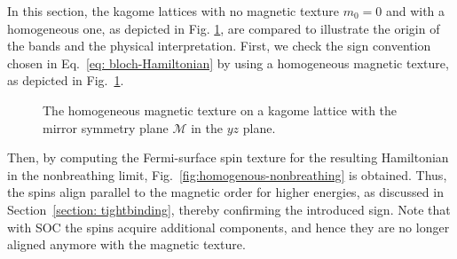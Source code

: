 
In this section, the kagome lattices with no magnetic texture $m_0=0$ and with a homogeneous one, as depicted in Fig. \ref{fig: magnetic texture homogenous}, are compared to illustrate the origin of the bands and the physical interpretation. 
First, we check the sign convention chosen in Eq.~\eqref{eq: bloch-Hamiltonian} by using a homogeneous magnetic texture, as depicted in Fig.~\ref{fig: magnetic texture homogenous}. 

\begin{figure}[tbhp]
    \centering
    \caption{The homogeneous magnetic texture on a kagome lattice with the mirror symmetry plane $\mathcal{M}$ in the $yz$ plane.}
    \label{fig: magnetic texture homogenous}
\end{figure}
Then, by computing the Fermi-surface spin texture for the resulting Hamiltonian in the nonbreathing limit, Fig.~\ref{fig:homogenous-nonbreathing} is obtained. Thus, the spins align parallel to the magnetic order for higher energies, as discussed in Section~\ref{section: tightbinding}, thereby confirming the introduced sign. Note that with SOC the spins acquire additional components, and hence they are no longer aligned anymore with the magnetic texture.\\

